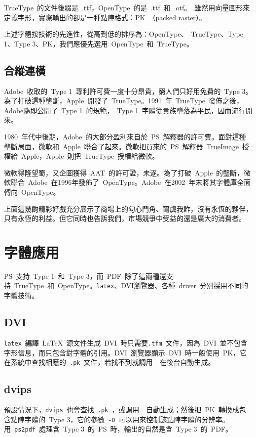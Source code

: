 TrueType~的文件後綴是~.ttf，OpenType~的是~.ttf~和~.otf。\MF~雖然用向量圖形來定義字形，實際輸出的卻是一種點陣格式：PK~（packed raster）。

上述字體按技術的先進性，從高到低的排序為：OpenType、~TrueType、Type 1、Type 3、PK，我們應優先選用~OpenType~和~TrueType。

\subsection{合縱連橫}
Adobe~收取的~Type 1~專利許可費一度十分昂貴，窮人們只好用免費的~Type 3。為了打破這種壟斷，Apple~開發了~TrueType。1991~年~TrueType~發佈之後，Adobe隨即公開了~Type 1~的規範，~Type 1~字體從貴族墮落為平民，因而流行開來。

1980~年代中後期，Adobe~的大部分盈利來自於~PS~解釋器的許可費。面對這種壟斷局面，微軟和~Apple~聯合了起來。微軟把買來的~PS~解釋器~TrueImage~授權給~Apple，Apple~則把~TrueType~授權給微軟。

微軟得隆望蜀，又企圖獲得~AAT~的許可證，未遂。為了打破~Apple~的壟斷，微軟聯合~Adobe~在1996年發佈了~OpenType。Adobe~在2002~年末將其字體庫全面轉向~OpenType。

上面這幾齣精彩好戲充分展示了商場上的勾心鬥角、爾虞我詐，沒有永恆的夥伴，只有永恆的利益。但它同時也告訴我們，市場競爭中受益的還是廣大的消費者。

\section{字體應用}

PS~支持~Type 1~和~Type 3，而~PDF~除了這兩種還支持~TrueType~和~OpenType。\verb|latex|、DVI瀏覽器、各種~driver~分別採用不同的字體技術。

\subsection{DVI}
\verb|latex|~編譯~\LaTeX~源文件生成~DVI~時只需要\verb|.tfm|~文件，因為~DVI~並不包含字形信息，而只包含對字體的引用。DVI~瀏覽器顯示~DVI~時一般使用~PK，它在系統中查找相應的~\verb|.pk|~文件，若找不到就調用~\MF~在後台自動生成。

\subsection{dvips}
預設情況下，\verb|dvips|~也會查找~\verb|.pk|~，或調用~\MF~自動生成；然後把~PK~轉換成包含點陣字體的~Type 3，它的參數~\verb|-D|~可以用來控制該點陣字體的分辨率。用~\verb|ps2pdf|~處理含~Type 3~的~PS~時，輸出的自然是含~Type 3~的~PDF。

